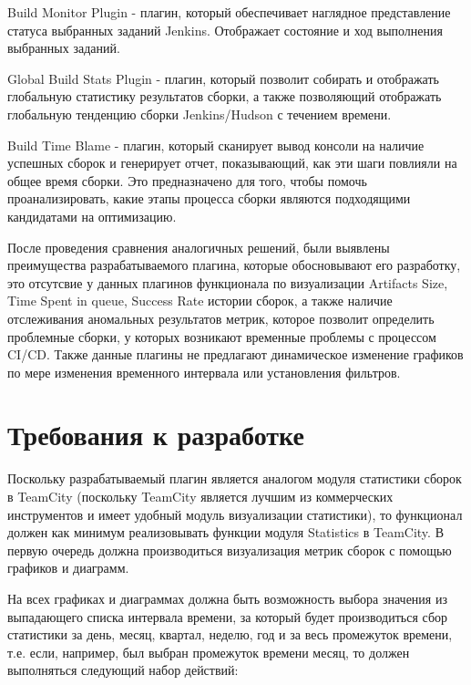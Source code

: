  Build Monitor Plugin - плагин, который обеспечивает наглядное представление статуса выбранных заданий Jenkins. Отображает состояние и ход выполнения выбранных заданий.
 
 Global Build Stats Plugin - плагин, который позволит собирать и отображать глобальную статистику результатов сборки, а также позволяющий отображать глобальную тенденцию сборки Jenkins/Hudson с течением времени.
 
  Build Time Blame - плагин, который сканирует вывод консоли на наличие успешных сборок и генерирует отчет, показывающий, как эти шаги повлияли на общее время сборки. Это предназначено для того, чтобы помочь проанализировать, какие этапы процесса сборки являются подходящими кандидатами на оптимизацию.
  
  После проведения сравнения аналогичных решений, были выявлены преимущества разрабатываемого плагина, которые обосновывают его разработку, это отсутсвие у данных плагинов функционала по визуализации Artifacts Size, Time Spent in queue, Success Rate истории сборок, а также наличие отслеживания аномальных результатов метрик, которое позволит определить проблемные сборки, у которых возникают временные проблемы с процессом CI/CD. Также данные плагины не предлагают динамическое изменение графиков по мере изменения временного интервала или установления фильтров.



\section{Требования к разработке} \label{ch1:sec6}

Поскольку разрабатываемый плагин является аналогом модуля статистики сборок в TeamCity (поскольку TeamCity является лучшим из коммерческих инструментов и имеет удобный модуль визуализации статистики), то функционал должен как минимум реализовывать функции модуля Statistics в TeamCity. В первую очередь должна производиться визуализация метрик сборок с помощью графиков и диаграмм.

На всех графиках и диаграммах должна быть возможность выбора значения из выпадающего списка интервала времени, за который будет производиться сбор статистики за день, месяц, квартал, неделю, год и за весь промежуток времени, т.е. если, например, был выбран промежуток времени месяц, то должен выполняться следующий набор действий:

